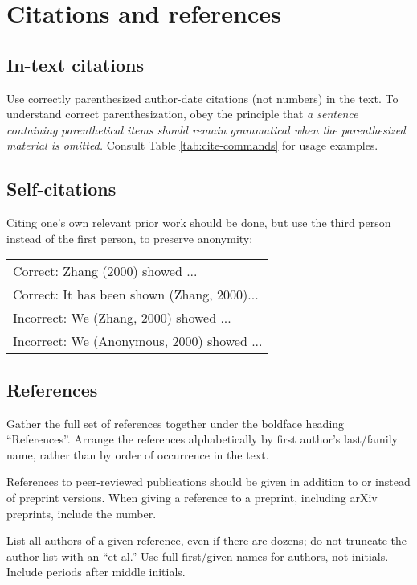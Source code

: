 \documentclass[11pt,a4paper]{article}
\newcommand{\ex}[1]{{\sf #1}}
\begin{document}
\section{Citations and references}
\label{sec:cite}


\subsection{In-text citations}
\label{sec:in-text-cite}
Use correctly parenthesized author-date citations
(not numbers) in the text. To understand correct parenthesization, obey the
principle that \emph{a sentence containing parenthetical items should remain
grammatical when the parenthesized material is omitted.} Consult Table
\ref{tab:cite-commands} for usage examples.


\iftaclfinal
\else
\subsection{Self-citations}
\label{sec:self-cite}

Citing one's own relevant prior work should be done,  but use the third
person instead of the first person, to preserve anonymity:
\begin{tabular}{l}
Correct: \ex{Zhang (2000) showed ...} \\
Correct: \ex{It has been shown (Zhang, 2000)...} \\
Incorrect: \ex{We (Zhang, 2000) showed ...} \\
Incorrect: \ex{We (Anonymous, 2000) showed ...}
\end{tabular}
\fi

\subsection{References}
\label{sec:references}
Gather the full set of references together under
the boldface heading ``References''. Arrange the references alphabetically
by first author's last/family name, rather than by order of occurrence in the
text.

References to peer-reviewed publications should be given in addition to or
instead of preprint versions. When giving a reference to a preprint, including
arXiv preprints, include the number.

List all authors of a given reference, even if there are dozens; do not
truncate the author list with an ``et al.''  Use full first/given names for
authors, not initials.  Include periods after middle initials.
\end{document}
